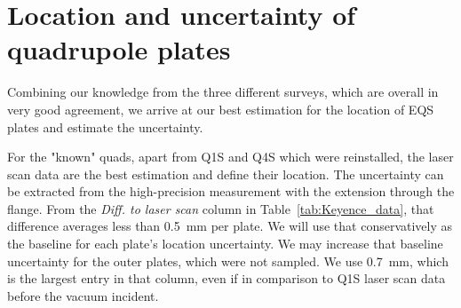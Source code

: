 \section{\label{sec:location_uncertainty} Location and uncertainty of quadrupole plates }
\medskip


Combining our knowledge from the three different surveys, which are overall in very good agreement, we arrive at our best estimation for the location of EQS plates and estimate the uncertainty.


For the "known" quads, apart from Q1S and Q4S which were reinstalled, the laser scan data are the best estimation and define their location.
The uncertainty can be extracted from the high-precision measurement with the extension through the flange. From the \textit{Diff. to laser scan} column in Table~\ref{tab:Keyence_data}, that difference averages less than \SI{0.5}{mm} per plate. We will use that conservatively as the baseline for each plate's location uncertainty. 
We may increase that baseline uncertainty for the outer plates, which were not sampled. We use \SI{0.7}{mm}, which is the largest entry in that column, even if in comparison to Q1S laser scan data before the vacuum incident. 



